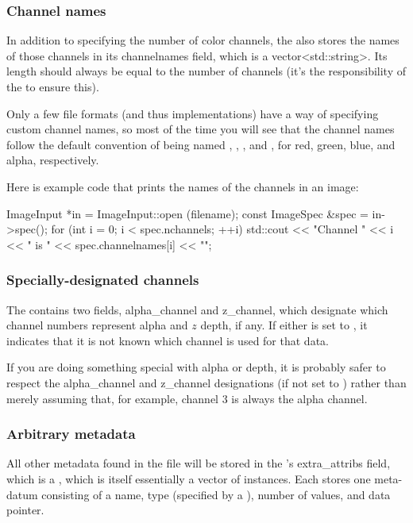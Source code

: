 \subsubsection{Channel names}

In addition to specifying the number of color channels, the
\ImageSpec also stores the names of those channels in its {\cf
  channelnames} field, which is a {\cf vector<std::string>}.  Its length
should always be equal to the number of channels (it's the
responsibility of the \ImageInput to ensure this).

Only a few file formats (and thus \ImageInput implementations) have a
way of specifying custom channel names, so most of the time you will see
that the channel names follow the default convention of being named
, , , and , for red, green, blue, and alpha,
respectively.

Here is example code that prints the names of the channels in an image:

\begin{code}
        ImageInput *in = ImageInput::open (filename);
        const ImageSpec &spec = in->spec();
        for (int i = 0;  i < spec.nchannels;  ++i)
            std::cout << "Channel " << i << " is " 
                      << spec.channelnames[i] << "\n";
\end{code}

\subsubsection{Specially-designated channels}

The \ImageSpec contains two fields, {\cf alpha_channel} and {\cf
  z_channel}, which designate which channel numbers represent alpha and
$z$ depth, if any.  If either is set to {}, it indicates that it
is not known which channel is used for that data.

If you are doing something special with alpha or depth, it is probably
safer to respect the {\cf alpha_channel} and {\cf z_channel}
designations (if not set to {}) rather than merely assuming that,
for example, channel 3 is always the alpha channel.

\subsubsection{Arbitrary metadata}

All other metadata found in the file will be stored in the
\ImageSpec's {\cf extra_attribs} field, which is a 
\ParamValueList, which is itself essentially a vector of
\ParamValue instances.  Each \ParamValue
stores one meta-datum consisting of a name, type (specified by 
a \TypeDesc), number of values, and data pointer.

